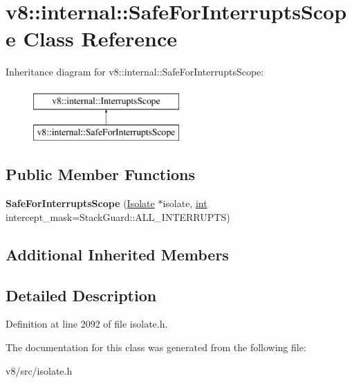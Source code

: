 \hypertarget{classv8_1_1internal_1_1SafeForInterruptsScope}{}\section{v8\+:\+:internal\+:\+:Safe\+For\+Interrupts\+Scope Class Reference}
\label{classv8_1_1internal_1_1SafeForInterruptsScope}
Inheritance diagram for v8\+:\+:internal\+:\+:Safe\+For\+Interrupts\+Scope\+:\begin{figure}[H]
\begin{center}
\leavevmode
\includegraphics[height=2.000000cm]{classv8_1_1internal_1_1SafeForInterruptsScope}
\end{center}
\end{figure}
\subsection*{Public Member Functions}
\begin{DoxyCompactItemize}
\item 
\mbox{\label{classv8_1_1internal_1_1SafeForInterruptsScope_a43592ec32792bc416e4eaa98bf5b1dbf}} 
{\bfseries Safe\+For\+Interrupts\+Scope} (\mbox{\hyperlink{classv8_1_1internal_1_1Isolate}{Isolate}} $\ast$isolate, \mbox{\hyperlink{classint}{int}} intercept\+\_\+mask=Stack\+Guard\+::\+A\+L\+L\+\_\+\+I\+N\+T\+E\+R\+R\+U\+P\+TS)
\end{DoxyCompactItemize}
\subsection*{Additional Inherited Members}


\subsection{Detailed Description}


Definition at line 2092 of file isolate.\+h.



The documentation for this class was generated from the following file\+:\begin{DoxyCompactItemize}
\item 
v8/src/isolate.\+h\end{DoxyCompactItemize}
